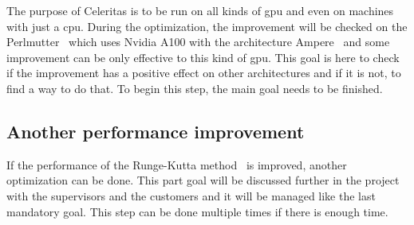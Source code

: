 The purpose of Celeritas is to be run on all kinds of \acrshort{gpu} and even on machines with just a \acrshort{cpu}.
During the optimization, the improvement will be checked on the Perlmutter~\cite{Perlmutter} which uses Nvidia A100 with the architecture Ampere~\cite{ampere} and some improvement can be only effective to this kind of \acrshort{gpu}.
This goal is here to check if the improvement has a positive effect on other architectures and if it is not, to find a way to do that.
To begin this step, the main goal needs to be finished.

\subsection{Another performance improvement}
\label{spec:ch:goals:optional-requirements:another-performance-improvement}

If the performance of the Runge-Kutta method~\cite{Runge-Kutta-methods} is improved, another optimization can be done.
This part goal will be discussed further in the project with the supervisors and the customers and it will be managed like the last mandatory goal.
This step can be done multiple times if there is enough time.

